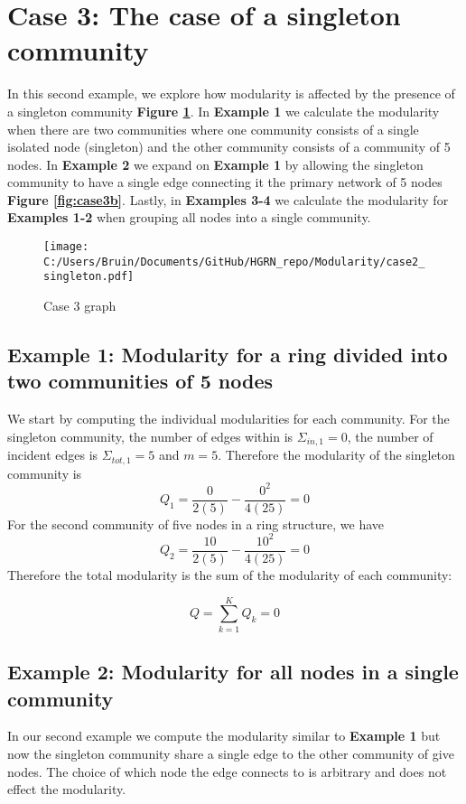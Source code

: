 \documentclass[a4paper,12pt]{article}
\begin{document}
	
	
	
	
	
	
	
	
	
	
	
	
	
	
	
	
	
	
	

	\section{Case 3: The case of a singleton community}
	In this second example, we explore how modularity is affected by the presence of a singleton community \textbf{Figure \ref{fig:case3}}. In \textbf{Example 1} we calculate the modularity when there are two communities where one community consists of a single isolated node (singleton) and the other community consists of a community of 5 nodes. In \textbf{Example 2} we expand on \textbf{Example 1} by allowing the singleton community to have a single edge connecting it the primary network of 5 nodes \textbf{Figure \ref{fig:case3b}}. Lastly, in \textbf{Examples 3-4} we calculate the modularity for \textbf{Examples 1-2} when grouping all nodes into a single community. 
	
	\begin{figure}[H]
		\centering
		\caption{Case 3 graph}
		\texttt{[image: C:/Users/Bruin/Documents/GitHub/HGRN\_repo/Modularity/case2\_singleton.pdf]}
		\label{fig:case3}
	\end{figure}
	
	\subsection{Example 1: Modularity for a ring divided into two communities of 5 nodes}
	We start by computing the individual modularities for each community. For the singleton community, the number of edges within is $\Sigma_{in,1} = 0$, the number of incident edges is $\Sigma_{tot,1} = 5$ and $m = 5$. Therefore the modularity of the singleton community is 
	\[Q_1 = \frac{0}{2(5)} - \frac{0^2}{4(25)} = 0\]
	For the second community of five nodes in a ring structure, we have 
	\[Q_2 = \frac{10}{2(5)} - \frac{10^2}{4(25)} = 0\]
	Therefore the total modularity is the sum of the modularity of each community:
	
	\[ Q = \sum_{k=1}^K Q_k = 0\]
	\subsection{Example 2: Modularity for all nodes in a single community}
	In our second example we compute the modularity similar to \textbf{Example 1} but now the singleton community share a single edge to the other community of give nodes. The choice of which node the edge connects to is arbitrary and does not effect the modularity.  
	
\end{document}
